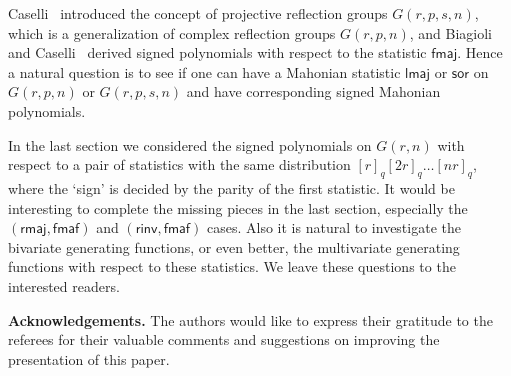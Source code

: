 \documentclass[a4paper, reqno, 11pt]{amsart}
\newcommand{\fmaj}{{\textsf{fmaj}}}
\newcommand{\lmaj}{{\textsf{lmaj}}}
\newcommand{\rmaj}{{\textsf{rmaj}}}
\newcommand{\fmaf}{{\textsf{fmaf}}}
\newcommand{\rinv}{{\textsf{rinv}}}
\newcommand{\sor}{{\textsf{sor}}}
\numberwithin{equation}{section}
\begin{document}
Caselli~\cite{Caselli_11} introduced the concept of projective reflection groups $G(r,p,s,n)$, which is a generalization of complex reflection groups $G(r,p,n)$, and Biagioli and Caselli~\cite{Biagioli_Caselli_12} derived signed polynomials with respect to the statistic $\fmaj$.
Hence a natural question is to see if one can have a Mahonian statistic $\lmaj$ or $\sor$ on $G(r,p,n)$ or $G(r,p,s,n)$ and have corresponding signed Mahonian polynomials.


In the last section we considered the signed polynomials on $G(r,n)$ with respect to a pair of statistics with the same distribution $[r]_q[2r]_q\dots [nr]_q$, where the `sign' is decided by the parity of the first statistic. 
It would be interesting to complete the missing pieces in the last section, especially the $(\rmaj, \fmaf)$ and $(\rinv, \fmaf)$ cases. 
Also it is natural to investigate the bivariate generating functions, or even better, the multivariate generating functions with respect to these statistics. 
We leave these questions to the interested readers.




\bigskip

\noindent \textbf{Acknowledgements.}
The authors would like to express their gratitude to the referees for their valuable comments and suggestions on improving the presentation of this paper.
\end{document}
